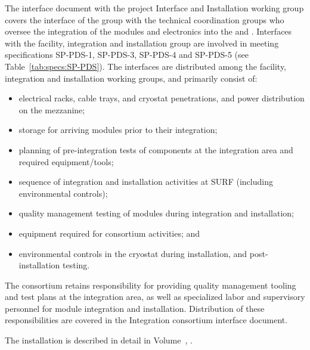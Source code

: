 The interface document with the project Interface and Installation working group covers the interface of the  group with the technical coordination groups who oversee the integration of the  modules and electronics into the  and . Interfaces with the facility, integration and installation group are involved in meeting specifications SP-PDS-1, SP-PDS-3, SP-PDS-4 and SP-PDS-5 (see Table~\ref{tab:specs:SP-PDS}).  The interfaces are distributed among the facility, integration and installation working groups, and primarily consist of:
\begin{itemize}
    \item electrical racks, cable trays, and cryostat penetrations, and power distribution on the mezzanine;
    \item storage for arriving  modules prior to their integration;
    \item planning of pre-integration tests of  components at the integration area and required equipment/tools;
    \item sequence of integration and installation activities at SURF (including environmental controls);
    \item quality management testing of  modules during integration and installation;
    \item equipment required for  consortium activities; and
    \item environmental controls in the cryostat during installation, and post-installation testing.
\end{itemize}



The  consortium retains responsibility for providing quality management tooling and test plans at the integration area, as well as specialized labor and supervisory personnel for  module integration and installation. Distribution of these responsibilities are covered in the Integration  consortium interface document.


The installation is described in detail in 
Volume~\volnumbertc{}, \voltitletc{}.




